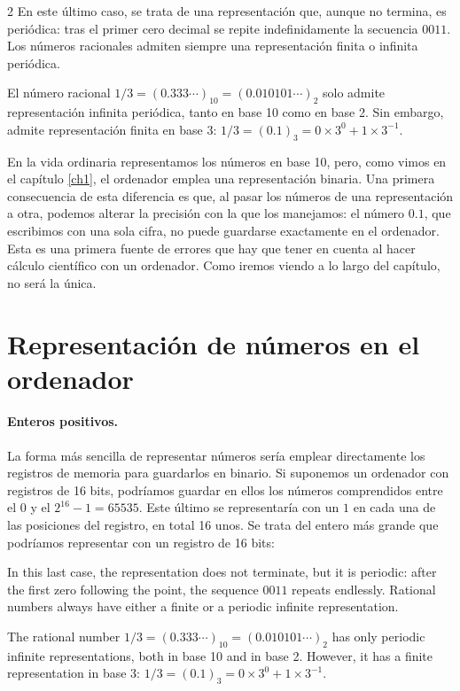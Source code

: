 \begin{paracol}{2}
En este último caso, se trata de una representación que, aunque no termina, es periódica: tras el primer cero decimal se repite indefinidamente la secuencia $0011$. Los números racionales admiten siempre una representación finita o infinita periódica.

El número racional $1/3=(0.333\cdots)_{10}=(0.010101\cdots)_2$ solo admite representación infinita periódica, tanto en base 10 como en base 2. Sin embargo, admite representación finita en base 3: $1/3=(0.1)_3=0\times3^0+1\times3^{-1}$.

En la vida ordinaria representamos los números en base 10, pero, como vimos en el capítulo \ref{ch1}, el ordenador emplea una representación binaria. Una primera consecuencia de esta diferencia es que, al pasar los números de una representación a otra, podemos alterar la precisión con la que los manejamos: el número $0.1$, que escribimos con una sola cifra, no puede guardarse exactamente en el ordenador. Esta es una primera fuente de errores que hay que tener en cuenta al hacer cálculo científico con un ordenador. Como iremos viendo a lo largo del capítulo, no será la única.

\section{Representación de nú\-meros en el ordenador}
\paragraph{Enteros positivos.} La forma más sencilla de representar números sería emplear directamente los registros de memoria para guardarlos en binario. Si suponemos un ordenador con registros de 16 bits, podríamos guardar en ellos los números comprendidos entre el $0$ y el $2^{16}-1=65535$. Este último se representaría con un $1$ en cada una de las posiciones del registro, en total 16 unos. Se trata del entero más grande que podríamos representar con un registro de 16 bits:

\switchcolumn
In this last case, the representation does not terminate, but it is periodic: after the first zero following the point, the sequence $0011$ repeats endlessly. Rational numbers always have either a finite or a periodic infinite representation.

The rational number $1/3=(0.333\cdots)_{10} = (0.010101\cdots)_2$ has only periodic infinite representations, both in base 10 and in base 2. However, it has a finite representation in base 3: $1/3=(0.1)_{3}= 0 \times 3^0 + 1\times 3^{-1}$.


\end{paracol}
